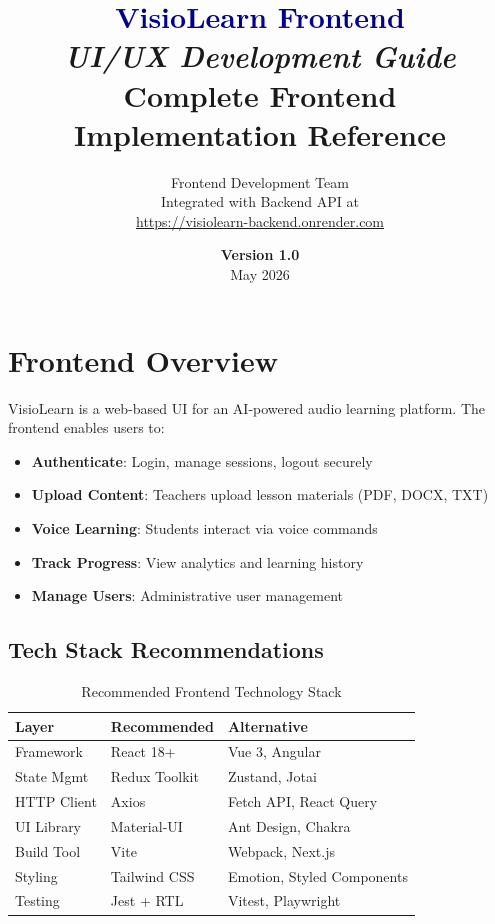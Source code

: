 \documentclass[12pt,a4paper,oneside]{article}
\title{%
    \vspace{2cm}
    \Huge\textbf{\textcolor{darkblue}{VisioLearn Frontend}} \\
    \vspace{0.5cm}
    \Large\textit{UI/UX Development Guide} \\
    \vspace{2cm}
    \large\textbf{Complete Frontend Implementation Reference}
}
\author{%
    Frontend Development Team \\
    \vspace{0.5cm}
    Integrated with Backend API at \\
    \href{https://visiolearn-backend.onrender.com}{https://visiolearn-backend.onrender.com}
}
\date{\vspace{1cm}\large \textbf{Version 1.0} \\ May 2026}
\begin{document}
\maketitle
\thispagestyle{empty}
\newpage

\tableofcontents
\newpage

\section{Frontend Overview}

VisioLearn is a web-based UI for an AI-powered audio learning platform. The frontend enables users to:

\begin{itemize}
    \item \textbf{Authenticate}: Login, manage sessions, logout securely
    \item \textbf{Upload Content}: Teachers upload lesson materials (PDF, DOCX, TXT)
    \item \textbf{Voice Learning}: Students interact via voice commands
    \item \textbf{Track Progress}: View analytics and learning history
    \item \textbf{Manage Users}: Administrative user management
\end{itemize}

\subsection{Tech Stack Recommendations}

\begin{table}[H]
\centering
\small
\begin{tabular}{|l|l|l|}
\hline
\textbf{Layer} & \textbf{Recommended} & \textbf{Alternative} \\
\hline
Framework & React 18+ & Vue 3, Angular \\
State Mgmt & Redux Toolkit & Zustand, Jotai \\
HTTP Client & Axios & Fetch API, React Query \\
UI Library & Material-UI & Ant Design, Chakra \\
Build Tool & Vite & Webpack, Next.js \\
Styling & Tailwind CSS & Emotion, Styled Components \\
Testing & Jest + RTL & Vitest, Playwright \\
\hline
\end{tabular}
\caption{Recommended Frontend Technology Stack}
\end{table}
\end{document}
